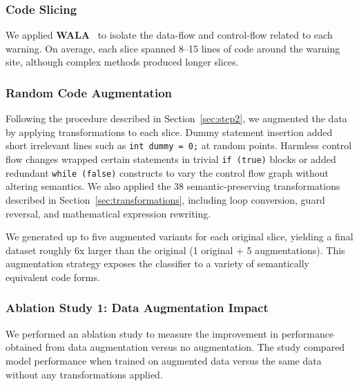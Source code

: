 \documentclass[acmsmall,screen,review,anonymous]{acmart}
\begin{document}
\subsubsection{Code Slicing}
\label{sec:codeslicing}

We applied \textbf{WALA}~\cite{wala} to isolate the data-flow and control-flow related to each warning. On average, each slice spanned 8--15 lines of code around the warning site, although complex methods produced longer slices.

\subsubsection{Random Code Augmentation}
\label{sec:randomaug}

Following the procedure described in Section~\ref{sec:step2}, we augmented the data by applying transformations to each slice. Dummy statement insertion added short irrelevant lines such as \texttt{int dummy = 0;} at random points. Harmless control flow changes wrapped certain statements in trivial \texttt{if (true)} blocks or added redundant \texttt{while (false)} constructs to vary the control flow graph without altering semantics. We also applied the 38 semantic-preserving transformations described in Section~\ref{sec:transformations}, including loop conversion, guard reversal, and mathematical expression rewriting.

We generated up to five augmented variants for each original slice, yielding a final dataset roughly 6x larger than the original (1 original + 5 augmentations). This augmentation strategy exposes the classifier to a variety of semantically equivalent code forms.

\subsubsection{Ablation Study 1: Data Augmentation Impact}
\label{sec:ablation1}

We performed an ablation study to measure the improvement in performance obtained from data augmentation versus no augmentation. The study compared model performance when trained on augmented data versus the same data without any transformations applied.
\end{document}
